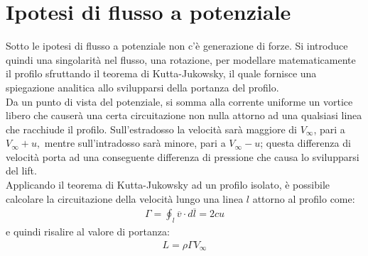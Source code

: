 \section{Ipotesi di flusso a potenziale}
Sotto le ipotesi di flusso a potenziale non c'è generazione di forze. Si introduce quindi una singolarità nel flusso, una rotazione, per modellare matematicamente il profilo sfruttando il teorema di Kutta-Jukowsky, il quale fornisce una spiegazione analitica allo svilupparsi della portanza del profilo.\\
Da un punto di vista del potenziale, si somma alla corrente uniforme un vortice libero che causerà una certa circuitazione non nulla attorno ad una qualsiasi linea che racchiude il profilo. Sull'estradosso la velocità sarà maggiore di $V_{\infty}$, pari a $V_{\infty}+u,$ mentre sull'intradosso sarà minore, pari a $V_{\infty}-u$; questa differenza di velocità porta ad una conseguente differenza di pressione che causa lo svilupparsi del lift.\\
Applicando il teorema di Kutta-Jukowsky ad un profilo isolato, è possibile calcolare la circuitazione della velocità lungo una linea $l$ attorno al profilo come:
\begin{align*}
\Gamma = \oint_l \overline{v} \cdot d \overline{l} = 2cu
\end{align*}
e quindi risalire al valore di portanza:
\begin{align*}
L=\rho \Gamma V_\infty
\end{align*}

